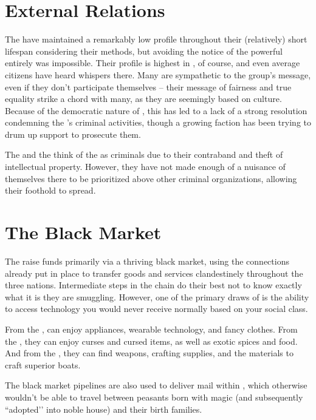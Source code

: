 \documentclass[blue]{GL2020}
\begin{document}
\section*{External Relations}
The \pGoaties{} have maintained a remarkably low profile throughout their (relatively) short lifespan considering their methods, but avoiding the notice of the powerful entirely was impossible. Their profile is highest in \pShip{}, of course, and even average citizens have heard whispers there. Many \pShippies{} are sympathetic to the group's message, even if they don’t participate themselves -- their message of fairness and true equality strike a chord with many, as they are seemingly based on \pShip{} culture. Because of the democratic nature of \pShip{}, this has led to a lack of a strong resolution condemning the \pGoaties{}'s criminal activities, though a growing faction has been trying to drum up support to prosecute them.

The \pTech{} and the \pFarm{} think of the \pGoaties{} as criminals due to their contraband and theft of intellectual property. However, they have not made enough of a nuisance of themselves there to be prioritized above other criminal organizations, allowing their foothold to spread.

\section*{The Black Market}
The \pGoaties{} raise funds primarily via a thriving black market, using the connections already put in place to transfer goods and services clandestinely throughout the three nations. Intermediate steps in the chain do their best not to know exactly what it is they are smuggling. However, one of the primary draws of \pGoaties{} is the ability to access technology you would never receive normally based on your social class. 

From the \pTech{}, \pGoaties{} can enjoy appliances, wearable technology, and fancy clothes.
From the \pFarm{}, they can enjoy curses and cursed items, as well as exotic spices and food. And from the \pShip{}, they can find weapons, crafting supplies, and the materials to craft superior boats.

The black market pipelines are also used to deliver mail within \pFarm{}, which otherwise wouldn't be able to travel between peasants born with magic (and subsequently ``adopted’’ into noble house) and their birth families.
\end{document}
